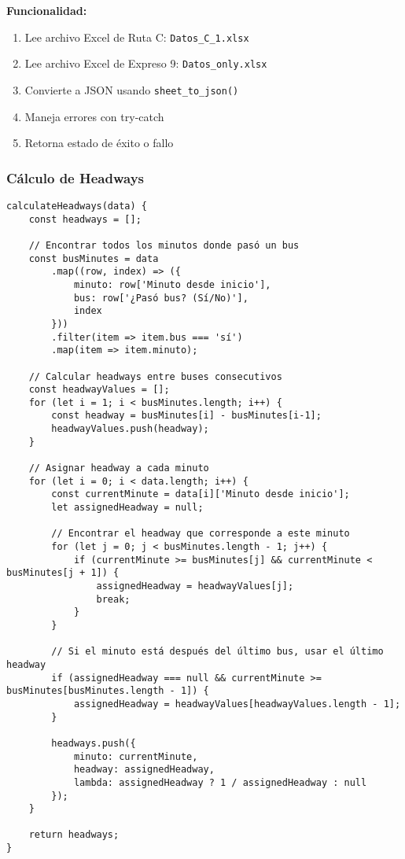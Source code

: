 \documentclass[12pt,a4paper]{article}
\begin{document}
\textbf{Funcionalidad:}
\begin{enumerate}
    \item Lee archivo Excel de Ruta C: \texttt{Datos\_C\_1.xlsx}
    \item Lee archivo Excel de Expreso 9: \texttt{Datos\_only.xlsx}
    \item Convierte a JSON usando \texttt{sheet\_to\_json()}
    \item Maneja errores con try-catch
    \item Retorna estado de éxito o fallo
\end{enumerate}

\subsubsection{Cálculo de Headways}

\begin{lstlisting}[caption=Método calculateHeadways()]
calculateHeadways(data) {
    const headways = [];
    
    // Encontrar todos los minutos donde pasó un bus
    const busMinutes = data
        .map((row, index) => ({ 
            minuto: row['Minuto desde inicio'], 
            bus: row['¿Pasó bus? (Sí/No)'], 
            index 
        }))
        .filter(item => item.bus === 'sí')
        .map(item => item.minuto);

    // Calcular headways entre buses consecutivos
    const headwayValues = [];
    for (let i = 1; i < busMinutes.length; i++) {
        const headway = busMinutes[i] - busMinutes[i-1];
        headwayValues.push(headway);
    }

    // Asignar headway a cada minuto
    for (let i = 0; i < data.length; i++) {
        const currentMinute = data[i]['Minuto desde inicio'];
        let assignedHeadway = null;

        // Encontrar el headway que corresponde a este minuto
        for (let j = 0; j < busMinutes.length - 1; j++) {
            if (currentMinute >= busMinutes[j] && currentMinute < busMinutes[j + 1]) {
                assignedHeadway = headwayValues[j];
                break;
            }
        }

        // Si el minuto está después del último bus, usar el último headway
        if (assignedHeadway === null && currentMinute >= busMinutes[busMinutes.length - 1]) {
            assignedHeadway = headwayValues[headwayValues.length - 1];
        }

        headways.push({
            minuto: currentMinute,
            headway: assignedHeadway,
            lambda: assignedHeadway ? 1 / assignedHeadway : null
        });
    }

    return headways;
}
\end{lstlisting}
\end{document}
